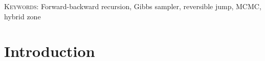 \documentclass[11pt]{article}
\begin{document}
\vspace*{.3in}

\noindent\textsc{Keywords}: {Forward-backward recursion, Gibbs sampler, reversible jump, MCMC, hybrid zone}

\newpage

\section{Introduction}
% 
% 
% 
% 
\end{document}
